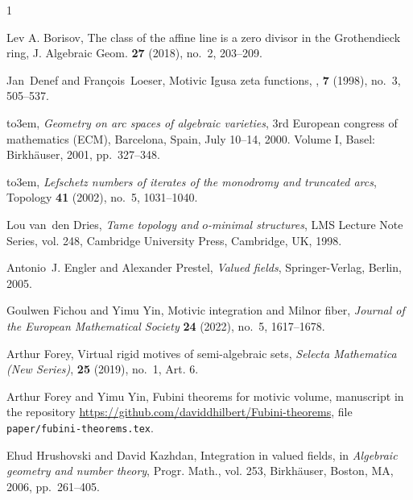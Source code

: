 \documentclass[12pt]{amsart}
\theoremstyle{plain}
\theoremstyle{definition}
\theoremstyle{remark}
\numberwithin{equation}{section}
\theoremstyle{plain}
\newcommand{\omin}{$o$\nobreakdash}
\newcommand{\0}{\emptyset}
\begin{document}
\providecommand{\bysame}{\leavevmode\hbox to3em{\hrulefill}\thinspace}
\providecommand{\MR}{\relax\ifhmode\unskip\space\fi MR }
\providecommand{\MRhref}[2]{%
  \href{http://www.ams.org/mathscinet-getitem?mr=#1}{#2}
}
\providecommand{\href}[2]{#2}
\begin{thebibliography}{1}

Lev A. Borisov, {The class of the affine line is a zero divisor in the
  {G}rothendieck ring}, J. Algebraic Geom. \textbf{27} (2018), no.~2, 203--209.

Jan~Denef and Fran\c cois~Loeser,
\newblock Motivic {{Igusa}} zeta functions,
, \textbf{7} (1998), no.~3, 505--537.

\bysame, \emph{{Geometry on arc spaces of algebraic varieties}}, {3rd European
  congress of mathematics (ECM), Barcelona, Spain, July 10--14, 2000. Volume
  I}, Basel: Birkh\"auser, 2001, pp.~327--348.

\bysame, \emph{Lefschetz numbers of iterates of the monodromy and truncated
  arcs}, Topology \textbf{41} (2002), no.~5, 1031--1040.

Lou van~den Dries, \emph{Tame topology and \omin-minimal structures}, LMS Lecture Note
  Series, vol. 248, Cambridge University Press, Cambridge, UK, 1998.

Antonio~J. Engler and Alexander Prestel, \emph{Valued fields}, Springer-Verlag,
  Berlin, 2005.

Goulwen Fichou and Yimu Yin, {Motivic integration and Milnor fiber}, {\em Journal of the European Mathematical Society} \textbf{24} (2022), no.~5, 1617--1678.


Arthur Forey, {Virtual rigid motives of semi-algebraic sets}, {\em Selecta Mathematica (New Series)}, \textbf{25} (2019),  no.~1, Art. 6.


Arthur Forey and Yimu Yin, {Fubini theorems for motivic volume}, manuscript in the repository \url{https://github.com/daviddhilbert/Fubini-theorems}, file \texttt{paper/fubini-theorems.tex}.

Ehud Hrushovski and David Kazhdan, {Integration in valued fields}, in
  {\em Algebraic geometry and number theory}, Progr. Math., vol. 253, Birkh\"{a}user,
  Boston, MA, 2006, pp.~261--405.


\end{thebibliography}
\end{document}
